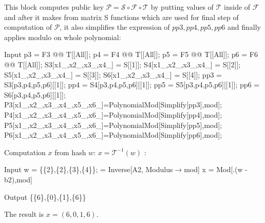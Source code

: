 \documentclass[thesis=M,english]{FITthesis}[2019/12/23]
\begin{document}
\noindent
This block computes public key $\mathcal{P} = \mathcal{S} \circ \mathcal{F} \circ \mathcal{T}$ by putting values of $\mathcal{T}$ inside of $\mathcal{F}$ and after it makes from matrix S functions which are used for final step of computation of $\mathcal{P}$, it also simplifies the expression of $pp3,pp4,pp5,pp6$ and finally applies modulo on whole polynomial:
\begin{mmaCell}[moredefined={p3, p4, p5, p6, S3, S4, S5, S6, mod, P3, P4, P5, P6, pp3,pp4,pp5,pp6, F3, F4, F5,F6, T, S},morepattern={x1_, x2_, x3_, x4_, x5_, x6_},leftmargin=1.5em]{Input}
p3 = F3 @@ T[[All]];
p4 = F4 @@ T[[All]];
p5 = F5 @@ T[[All]];
p6 = F6 @@ T[[All]];
S3[x1_,x2_,x3_,x4_] = S[[1]];
S4[x1_,x2_,x3_,x4_] = S[[2]];
S5[x1_,x2_,x3_,x4_] = S[[3]];
S6[x1_,x2_,x3_,x4_] = S[[4]];
pp3 = S3[p3,p4,p5,p6][[1]];
pp4 = S4[p3,p4,p5,p6][[1]];
pp5 = S5[p3,p4,p5,p6][[1]];
pp6 = S6[p3,p4,p5,p6][[1]];
P3[x1_,x2_,x3_,x4_,x5_,x6_]=PolynomialMod[Simplify[pp3],mod];
P4[x1_,x2_,x3_,x4_,x5_,x6_]=PolynomialMod[Simplify[pp4],mod];
P5[x1_,x2_,x3_,x4_,x5_,x6_]=PolynomialMod[Simplify[pp5],mod];
P6[x1_,x2_,x3_,x4_,x5_,x6_]=PolynomialMod[Simplify[pp6],mod];
\end{mmaCell}

\noindent
Computation $x$ from hash $w$: $x = \mathcal{T}^{-1}(w)$ :
\begin{mmaCell}[moredefined={w, A2, b2, S, x, mod}]{Input}
w = \{\{2\},\{2\},\{3\},\{4\}\};
 = Inverse[A2, Modulus\(\pmb{\to}\)mod]
x = Mod[.(w - b2),mod]
\end{mmaCell}
\begin{mmaCell}{Output}
\{\{6\},\{0\},\{1\},\{6\}\}
\end{mmaCell}

\noindent
The result is $x = (6,0,1,6)$.
\end{document}
